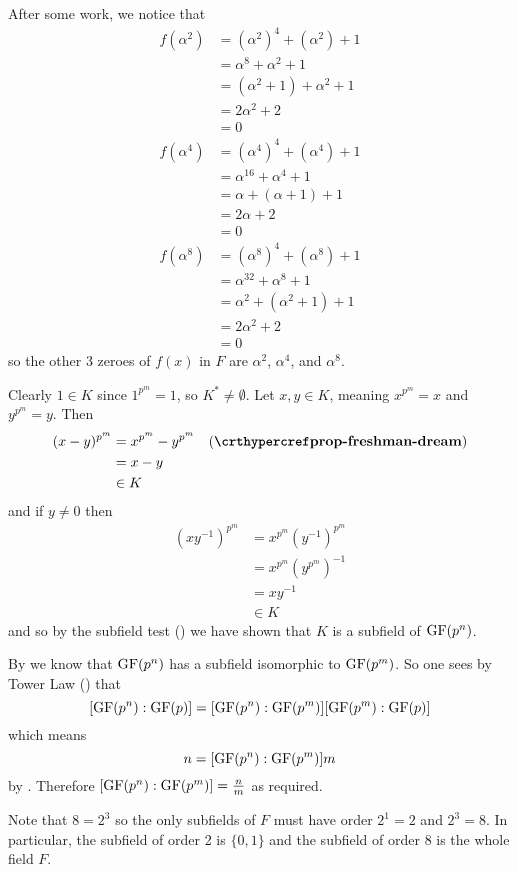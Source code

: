 \begin{questions}
    \item After some work, we notice that
    \begin{align*}
        f(\alpha^2) &= (\alpha^2)^4 + (\alpha^2) + 1\\
        &= \alpha^8 + \alpha^2 + 1\\
        &= (\alpha^2 + 1) + \alpha^2 + 1\\
        &= 2\alpha^2 + 2\\
        &= 0\\
        f(\alpha^4) &= (\alpha^4)^4 + (\alpha^4) + 1\\
        &= \alpha^{16} + \alpha^4 + 1\\
        &= \alpha + (\alpha + 1) + 1\\
        &= 2\alpha + 2\\
        &= 0\\
        f(\alpha^8) &= (\alpha^8)^4 + (\alpha^8) + 1\\
        &= \alpha^{32} + \alpha^8 + 1\\
        &= \alpha^2 + (\alpha^2 + 1) + 1\\
        &= 2\alpha^2 + 2\\
        &= 0
    \end{align*}
    so the other 3 zeroes of $f(x)$ in $F$ are $\alpha^2$, $\alpha^4$, and $\alpha^8$.

    \item Clearly $1 \in K$ since $1^{p^m} = 1$, so $K^\ast \neq \emptyset$. Let $x, y \in K$, meaning $x^{p^m} = x$ and $y^{p^m} = y$. Then
    \begin{align*}
        (x-y)^{p^m} &= x^{p^m} - y^{p^m} & (\myref{prop-freshman-dream})\\
        &= x - y\\
        &\in K
    \end{align*}
    and if $y \neq 0$ then
    \begin{align*}
        (xy^{-1})^{p^m} &= x^{p^m}\left(y^{-1}\right)^{p^m}\\
        &= x^{p^m}\left(y^{p^m}\right)^{-1}\\
        &= xy^{-1}\\
        &\in K
    \end{align*}
    and so by the subfield test () we have shown that $K$ is a subfield of $\mathrm{GF}(p^n)$.

    \item By  we know that $\mathrm{GF}(p^n)$ has a subfield isomorphic to $\mathrm{GF}(p^m)$. So one sees by Tower Law () that
    \[
        [\mathrm{GF}(p^n):\mathrm{GF}(p)] = [\mathrm{GF}(p^n):\mathrm{GF}(p^m)][\mathrm{GF}(p^m):\mathrm{GF}(p)]
    \]
    which means
    \[
        n = [\mathrm{GF}(p^n):\mathrm{GF}(p^m)]m
    \]
    by . Therefore $[\mathrm{GF}(p^n):\mathrm{GF}(p^m)] = \frac nm$ as required.

    \item Note that $8 = 2^3$ so the only subfields of $F$ must have order $2^1 = 2$ and $2^3 = 8$. In particular, the subfield of order 2 is $\{0, 1\}$ and the subfield of order 8 is the whole field $F$.
\end{questions}

